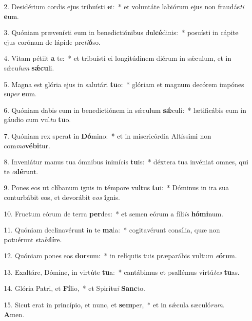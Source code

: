 2. Desidérium cordis ejus tribuísti \textbf{e}i:~*  et voluntáte labiórum ejus non fraudás\textit{ti} \textbf{e}um.\

3. Quóniam prævenísti eum in benedictiónibus dul\textbf{cé}dinis:~*  posuísti in cápite ejus corónam de lápide pre\textit{ti}\textbf{ó}so.\

4. Vitam pétiit \textbf{a} te:~*  et tribuísti ei longitúdinem diérum in sǽculum, et in sǽcu\textit{lum} \textbf{sǽ}\textbf{cu}li.\

5. Magna est glória ejus in salutári \textbf{tu}o:~*  glóriam et magnum decórem impónes su\textit{per} \textbf{e}um.\

6. Quóniam dabis eum in benedictiónem in sǽculum \textbf{sǽ}culi:~*  lætificábis eum in gáudio cum vul\textit{tu} \textbf{tu}o.\

7. Quóniam rex sperat in \textbf{Dó}mino:~*  et in misericórdia Altíssimi non com\textit{mo}\textbf{vé}\textbf{bi}tur.\

8. Inveniátur manus tua ómnibus inimícis \textbf{tu}is:~*  déxtera tua invéniat omnes, qui te \textit{o}\textbf{dé}runt.\

9. Pones eos ut clíbanum ignis in témpore vultus \textbf{tu}i:~*  Dóminus in ira sua conturbábit eos, et devorábit e\textit{os} \textbf{i}gnis.\

10. Fructum eórum de terra \textbf{per}des:~*  et semen eórum a fíli\textit{is} \textbf{hó}\textbf{mi}num.\

11. Quóniam declinavérunt in te \textbf{ma}la:~*  cogitavérunt consília, quæ non potuérunt sta\textit{bi}\textbf{lí}re.\

12. Quóniam pones eos \textbf{dor}sum:~*  in relíquiis tuis præparábis vultum \textit{e}\textbf{ó}rum.\

13. Exaltáre, Dómine, in virtúte \textbf{tu}a:~*  cantábimus et psallémus virtú\textit{tes} \textbf{tu}as.\

14. Glória Patri, et \textbf{Fí}lio,~*  et Spirítu\textit{i} \textbf{Sanc}to.\

15. Sicut erat in princípio, et nunc, et \textbf{sem}per,~*  et in sǽcula sæculó\textit{rum}. \textbf{A}men.\

